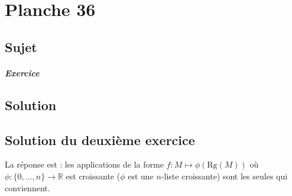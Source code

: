 \chapter{Planche 36}

\section{Sujet}

\paragraph{Exercice}

\section{Solution}


\section{Solution du deuxième exercice}

La réponse est : les applications de la forme $f: \displaystyle M\mapsto \phi(\mbox{Rg}(M))$ où $\displaystyle \phi : \{0,\ldots,n\}\rightarrow \mathbb{R}$ est croissante ($\phi$ est une $n$-liste croissante) sont les seules qui conviennent.

